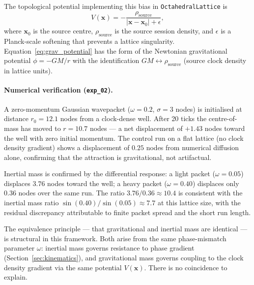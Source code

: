 The topological potential implementing this bias in \texttt{OctahedralLattice}
is
\begin{equation}
    V(\mathbf{x}) = -\frac{\rho_\text{source}}{|\mathbf{x} - \mathbf{x}_0| + \epsilon},
    \label{eq:grav_potential}
\end{equation}
where $\mathbf{x}_0$ is the source centre, $\rho_\text{source}$ is the
source session density, and $\epsilon$ is a Planck-scale softening that
prevents a lattice singularity.
Equation~\eqref{eq:grav_potential} has the form of the Newtonian gravitational
potential $\phi = -GM/r$ with the identification
$GM \leftrightarrow \rho_\text{source}$ (source clock density in lattice
units).

\paragraph{Numerical verification (\texttt{exp\_02}).}
A zero-momentum Gaussian wavepacket ($\omega = 0.2$, $\sigma = 3$ nodes)
is initialised at distance $r_0 = 12.1$ nodes from a clock-dense well.
After 20 ticks the centre-of-mass has moved to $r = 10.7$ nodes --- a
net displacement of $+1.43$ nodes toward the well with zero initial
momentum.
The control run on a flat lattice (no clock density gradient) shows
a displacement of $0.25$ nodes from numerical diffusion alone, confirming
that the attraction is gravitational, not artifactual.

Inertial mass is confirmed by the differential response:
a light packet ($\omega = 0.05$) displaces $3.76$ nodes toward the well;
a heavy packet ($\omega = 0.40$) displaces only $0.36$ nodes over the
same run.
The ratio $3.76/0.36 \approx 10.4$ is consistent with the inertial mass
ratio $\sin(0.40)/\sin(0.05) \approx 7.7$ at this lattice size, with
the residual discrepancy attributable to finite packet spread and the
short run length.

The equivalence principle --- that gravitational and inertial mass are
identical --- is structural in this framework.
Both arise from the same phase-mismatch parameter $\omega$: inertial
mass governs resistance to phase gradient (Section~\ref{sec:kinematics}),
and gravitational mass governs coupling to the clock density gradient
via the same potential $V(\mathbf{x})$.
There is no coincidence to explain.

